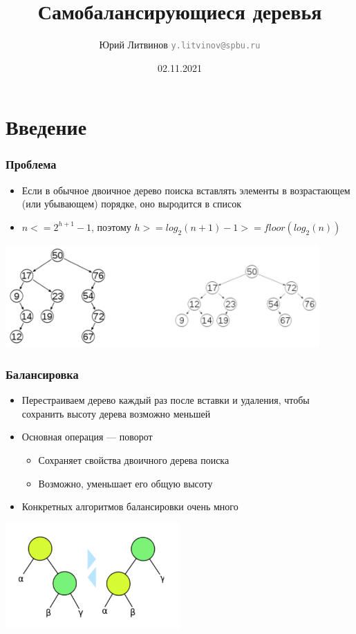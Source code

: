\documentclass[xetex,mathserif,serif]{beamer}
\title{Самобалансирующиеся деревья}
\author[Юрий Литвинов]{Юрий Литвинов \newline \textcolor{gray}{\small\texttt{y.litvinov@spbu.ru}}}
\date{02.11.2021}
\begin{document}
    \frame{\titlepage}

    \section{Введение}

    \begin{frame}
        \frametitle{Проблема}
        \begin{itemize}
            \item Если в обычное двоичное дерево поиска вставлять элементы в возрастающем (или убывающем) порядке, оно выродится в список
            \item $n <= 2^{h + 1} - 1$, поэтому $h >= log_2(n + 1) - 1 >= floor(log_2(n))$
        \end{itemize}
        \begin{center}
            \includegraphics[width=0.9\textwidth]{tree-problem.png}
        \end{center}
    \end{frame}

    \begin{frame}
        \frametitle{Балансировка}
        \begin{itemize}
            \item Перестраиваем дерево каждый раз после вставки и удаления, чтобы сохранить высоту дерева возможно меньшей
            \item Основная операция --- поворот
            \begin{itemize}
                \item Сохраняет свойства двоичного дерева поиска
                \item Возможно, уменьшает его общую высоту
            \end{itemize}
            \item Конкретных алгоритмов балансировки очень много
        \end{itemize}
        \begin{center}
            \includegraphics[width=0.5\textwidth]{balancing.png}
        \end{center}
    \end{frame}
\end{document}
